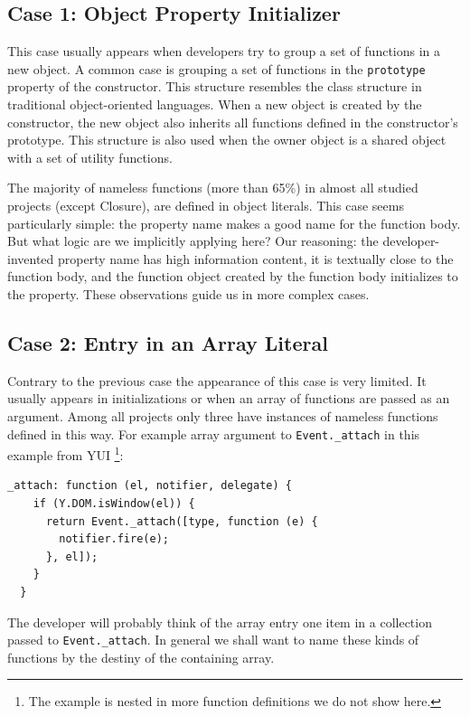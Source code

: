 \documentclass[10pt, preprint]{sigplanconf}
\begin{document}
\subsection{Case 1: Object Property Initializer}
 This case usually appears when developers try to group a set of functions in a new object. A common case is grouping a set of functions in the \verb|prototype| property of the constructor. This structure resembles the class structure in traditional object-oriented languages. When a new object is created by the constructor, the new object also inherits all functions defined in the constructor's prototype. This structure is also used  when the owner object is a shared object with a set of utility functions.
  
The majority of nameless functions (more than 65\%) in almost all studied projects (except Closure), are defined in object literals. This case seems particularly simple: the property name makes a good name for the function body. But what logic are we implicitly applying here? Our reasoning: the developer-invented property name has high information content, it is textually close to the function body, and the function object created by the function body initializes to the property. These observations guide us in more complex cases.
 
\subsection{Case 2: Entry in an Array Literal}
\label{sec:arrayLiteral}
Contrary to the previous case the appearance of this case is very limited. It usually appears in initializations or when an array of functions are passed as an argument. Among all projects only three have instances of nameless functions defined in this way. For example array argument to \verb|Event._attach| in this example from YUI \footnote[3]{The example is nested in more function definitions we do not show here.}:
\lstset{basicstyle=\scriptsize}
\begin{lstlisting}[frame=single, language=myLang]
  _attach: function (el, notifier, delegate) {
    if (Y.DOM.isWindow(el)) {
      return Event._attach([type, function (e) {
        notifier.fire(e);
      }, el]);
    }
  }
\end{lstlisting}
The developer will probably think of the array entry one item in a collection passed to \verb|Event._attach|. In general we shall want to name these kinds of functions by the destiny of the containing array.
\end{document}
